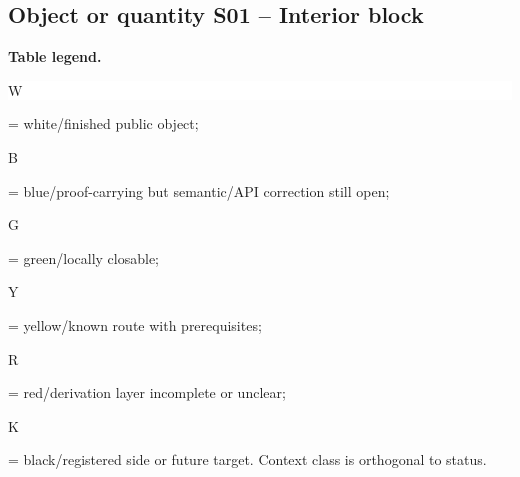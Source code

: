 \subsection*{Object or quantity S01 -- Interior block}
\hypertarget{objproof:S01}{}
\par\smallskip\noindent\begin{minipage}{0.99\linewidth}\footnotesize\raggedright\textbf{Table legend.} \colorbox{white}{\strut W} = white/finished public object; \colorbox{cyan!20}{\strut B} = blue/proof-carrying but semantic/API correction still open; \colorbox{green!18}{\strut G} = green/locally closable; \colorbox{yellow!25}{\strut Y} = yellow/known route with prerequisites; \colorbox{red!20}{\strut R} = red/derivation layer incomplete or unclear; \colorbox{black!18}{\strut K} = black/registered side or future target. Context class is orthogonal to status.\end{minipage}\par\vspace{0.25em}
